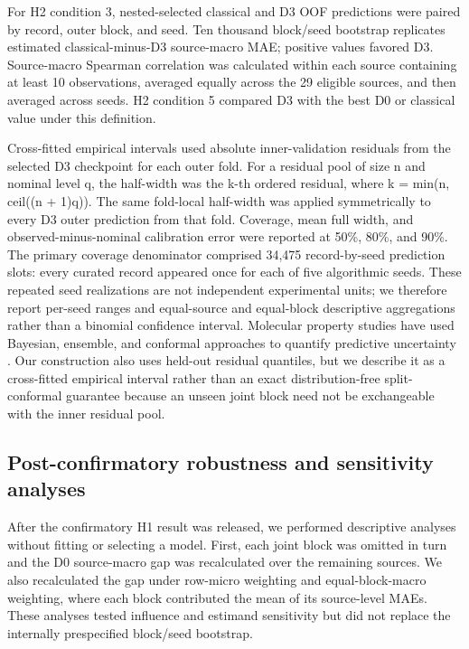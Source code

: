 \documentclass[referee,lineno,pdflatex,Numbered,sn-basic]{sn-jnl}
\begin{document}
For H2 condition 3, nested-selected classical and D3 OOF predictions were paired by record, outer block, and seed. Ten thousand block/seed bootstrap replicates estimated classical-minus-D3 source-macro MAE; positive values favored D3. Source-macro Spearman correlation was calculated within each source containing at least 10 observations, averaged equally across the 29 eligible sources, and then averaged across seeds. H2 condition 5 compared D3 with the best D0 or classical value under this definition.

Cross-fitted empirical intervals used absolute inner-validation residuals from the selected D3 checkpoint for each outer fold. For a residual pool of size n and nominal level q, the half-width was the k-th ordered residual, where k = min(n, ceil((n + 1)q)). The same fold-local half-width was applied symmetrically to every D3 outer prediction from that fold. Coverage, mean full width, and observed-minus-nominal calibration error were reported at 50\%, 80\%, and 90\%. The primary coverage denominator comprised 34,475 record-by-seed prediction slots: every curated record appeared once for each of five algorithmic seeds. These repeated seed realizations are not independent experimental units; we therefore report per-seed ranges and equal-source and equal-block descriptive aggregations rather than a binomial confidence interval. Molecular property studies have used Bayesian, ensemble, and conformal approaches to quantify predictive uncertainty \cite{zhang2019bayesian,hirschfeld2020uncertainty,li2024conformalized}. Our construction also uses held-out residual quantiles, but we describe it as a cross-fitted empirical interval rather than an exact distribution-free split-conformal guarantee because an unseen joint block need not be exchangeable with the inner residual pool.

\subsection{Post-confirmatory robustness and sensitivity analyses}

After the confirmatory H1 result was released, we performed descriptive analyses without fitting or selecting a model. First, each joint block was omitted in turn and the D0 source-macro gap was recalculated over the remaining sources. We also recalculated the gap under row-micro weighting and equal-block-macro weighting, where each block contributed the mean of its source-level MAEs. These analyses tested influence and estimand sensitivity but did not replace the internally prespecified block/seed bootstrap.
\end{document}
